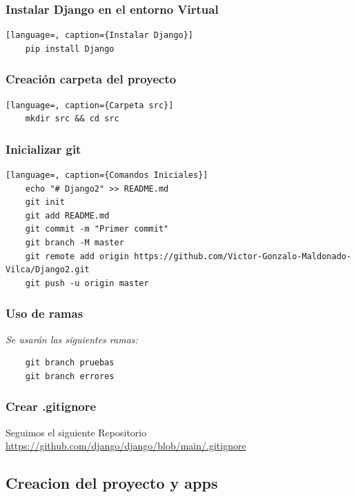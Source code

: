 \documentclass{article}
\begin{document}

  \subsubsection{Instalar Django en el entorno Virtual}
  \begin{lstlisting}[language=, caption={Instalar Django}]
    pip install Django
  \end{lstlisting}
  

  \subsubsection{Creación carpeta del proyecto}
  \begin{lstlisting}[language=, caption={Carpeta src}]
    mkdir src && cd src
  \end{lstlisting}
  

  \subsubsection{Inicializar git}
  \begin{lstlisting}[language=, caption={Comandos Iniciales}]
    echo "# Django2" >> README.md
    git init
    git add README.md
    git commit -m "Primer commit"
    git branch -M master
    git remote add origin https://github.com/Victor-Gonzalo-Maldonado-Vilca/Django2.git
    git push -u origin master
  \end{lstlisting}
  \newpage
  

  \subsubsection{Uso de ramas}
  \textit{Se usarán las siguientes ramas: }
  \begin{lstlisting}
    git branch pruebas
    git branch errores
  \end{lstlisting}
  

  \subsubsection{Crear .gitignore}
  Seguimos el siguiente Repositorio \url{https://github.com/django/django/blob/main/.gitignore}
  
  
  \subsection{Creacion del proyecto y apps}
  
\end{document}
